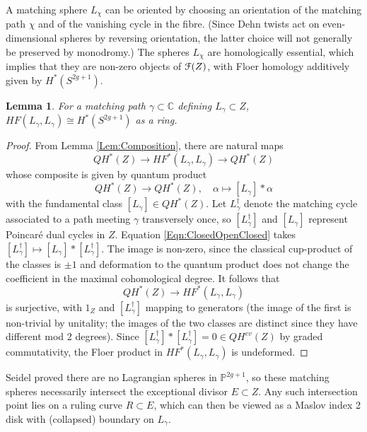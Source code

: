 \documentclass[reqno,10pt]{amsart}
\numberwithin{equation}{section}
\newcommand{\bC}{{\mathbb C}}
\newcommand{\bP}{{\mathbb P}}
\newcommand{\scrF}{\EuScript{F}}
\newtheorem{Lemma}[thm]{Lemma}
\theoremstyle{remark}
\begin{document}
A matching sphere $L_{\chi}$ can be oriented by choosing an orientation of the matching path $\chi$ and of the vanishing cycle in the fibre.  (Since Dehn twists act on even-dimensional spheres by reversing orientation, the latter choice will not generally be preserved by monodromy.) 
The spheres $L_{\chi}$ are homologically essential, which implies that they are non-zero objects of $\scrF(Z)$, with Floer homology additively given by $H^*(S^{2g+1})$.  

\begin{Lemma} \label{Lem:Unchanged}
For a matching path $\gamma \subset \bC$ defining  $L_{\gamma}\subset Z$, $HF(L_{\gamma}, L_{\gamma}) \cong H^*(S^{2g+1})$ as a ring.
\end{Lemma}

\begin{proof}
From Lemma \ref{Lem:Composition}, there are natural maps
\begin{equation} \label{Eqn:ClosedOpenClosed}
QH^*(Z) \rightarrow HF^*(L_{\gamma}, L_{\gamma}) \rightarrow QH^*(Z)
\end{equation}
whose composite is given by quantum product
\[
QH^*(Z) \longrightarrow QH^*(Z), \quad \alpha \mapsto [L_{\gamma}] \ast \alpha
\]
with the fundamental class $[L_{\gamma}] \in QH^*(Z)$.   Let $L_{\gamma}^{\dagger}$ denote the matching cycle associated to a path meeting $\gamma$ transversely once, so $[L_{\gamma}^{\dagger}]$ and $[L_{\gamma}]$ represent Poincar\'e dual cycles in $Z$.  Equation \ref{Eqn:ClosedOpenClosed} takes $[L_{\gamma}^{\dagger}] \mapsto [L_{\gamma}] \ast [L_{\gamma}^{\dagger}].$
The image is non-zero, since the classical cup-product of the classes is $\pm 1$ and deformation to the quantum product does not change the coefficient in the maximal cohomological degree.  It follows that 
\[
QH^*(Z) \rightarrow HF^*(L_{\gamma}, L_{\gamma})
\]
is surjective, with $1_Z$ and $[L_{\gamma}^{\dagger}]$ mapping to generators (the image of the first is non-trivial by unitality; the images of the two classes are distinct since they have different  mod 2 degrees). Since $[L_{\gamma}^{\dagger}]\ast [L_{\gamma}^{\dagger}] = 0 \in QH^{ev}(Z)$ by graded commutativity, the Floer product in $HF^*(L_{\gamma}, L_{\gamma})$ is undeformed.
\end{proof}

Seidel \cite{Seidel:graded} proved there are no Lagrangian spheres in $\bP^{2g+1}$, so these matching spheres necessarily intersect the exceptional divisor $E \subset Z$.  Any such intersection point lies on a ruling curve $R\subset E$, which can then be viewed as a Maslov index 2 disk with (collapsed) boundary on $L_{\gamma}$. 
\end{document}
